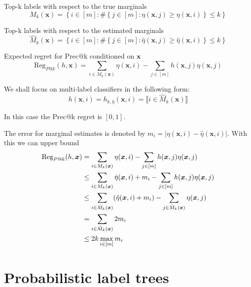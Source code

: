 \documentclass{article}
\renewcommand{\vec}[1]{\boldsymbol{#1}}
\newcommand{\bx}{\vec{x}}
\newcommand{\assert}[1]{\llbracket #1 \rrbracket}
\begin{document}
Top-k labels with respect to the true marginals
\[
M_k(\bx) = \left\{ i\in [m] : \# \left\{ j \in [m] : \eta(\bx, j) \ge \eta(\bx, i)  \right\} \le k\right\}
\]

Top-k labels with respect to the estimated marginals
\[
\hat{M}_k(\bx) = \left\{ i\in [m] : \# \left\{ j \in [m] : \hat{\eta}(\bx, j) \ge \hat{\eta}(\bx, i)  \right\} \le k\right\}
\]


Expected regret for Prec@k conditioned on $\bx$ 
\[
\mbox{Reg}_{P@k} (h, \bx) = \sum_{i \in M_k(\bx)} \eta (\bx ,i ) - \sum_{j \in [m]} h(\bx, j) \eta(\bx , j )
\]

We shall focus on multi-label classifiers in the following form:
\[
h(\bx,i) =h_{k, \hat{\eta}}(\bx,i) = \assert{\textstyle i \in \hat{M}_k(\bx) }
\]

In this case the Prec@k regret is $[0,1]$.

The error for marginal estimates is denoted by $m_i = \vert \eta (\bx ,i ) - \hat{\eta} (\bx ,i )\vert$. With this we can upper bound 
\begin{align}
\mbox{Reg}_{P@k} (h, \bx) 
  & = \sum_{i \in M_k(\bx)} \eta (\bx ,i ) - \sum_{j \in [m]} h(\bx, j) \eta(\bx , j ) \notag \\
  & \le \sum_{i \in M_k(\bx)} \hat{\eta} (\bx ,i ) + m_i - \sum_{j \in [m]} h(\bx, j) \eta(\bx , j ) \notag \\ 
  & \le \sum_{i \in \hat{M}_k(\bx)} (\hat{\eta} (\bx ,i ) + m_i )- \sum_{j \in \hat{M}_k(\bx)}  \eta(\bx , j ) \notag \\
  & = \sum_{i \in \hat{M}_k(\bx)} 2m_i \notag \\
  & \le 2k\max_{i \in [m]} m_i
\end{align}

\section{Probabilistic label trees}
\label{app:plt}
\end{document}
